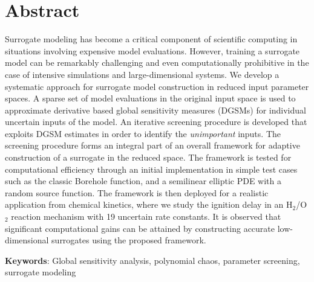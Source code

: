 \section*{Abstract}
Surrogate modeling has become a critical component of scientific computing
in situations involving expensive model evaluations. However, training a
surrogate model can be remarkably challenging and even computationally
prohibitive in the case of intensive simulations and large-dimensional
systems.
We develop a systematic approach for surrogate model
construction in reduced input parameter spaces.
%
A sparse set of model evaluations in the original input space is used to  
approximate derivative based global sensitivity measures (DGSMs) 
for individual uncertain inputs of the model.
An iterative screening procedure is developed that exploits DGSM estimates in
order to identify the \emph{unimportant} inputs. The screening procedure forms
an integral part of an overall framework for adaptive construction of a
surrogate in the reduced space. The framework is tested for computational
efficiency through an initial implementation in simple test cases such as the
classic Borehole function, and a semilinear elliptic PDE with a random source
function. 
The framework is then deployed for a realistic application from chemical
kinetics, where we study the ignition delay in an H$_2$/O$_2$ reaction
mechanism with 19 uncertain rate constants.  It is observed that significant
computational gains can be attained by constructing accurate low-dimensional
surrogates using the proposed framework.
\vspace{2mm}

\noindent
\textbf{Keywords}: Global sensitivity analysis,
polynomial chaos, parameter screening, surrogate modeling
 
